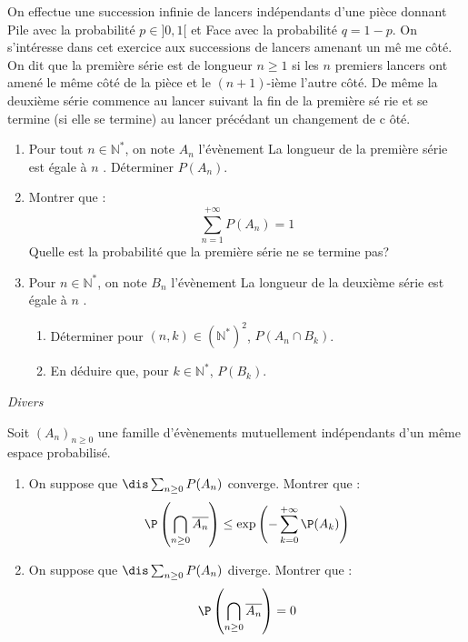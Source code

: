 \documentclass[a4paper,10pt]{report}
\begin{document}
\begin{Exercice}{} On effectue une succession infinie de lancers indépendants d'une pièce
donnant Pile avec la probabilité $p\in ]0,1[$ et Face avec la probabilité $%
q=1-p$.\newline
On s'intéresse dans cet exercice aux successions de lancers amenant un mê%
me côté.\newline
On dit que la première série est de longueur $n\geq 1$ si les $n$
premiers lancers ont amené le même côté de la pièce et le $(n+1)$-ième
l'autre côté.\newline
De même la deuxième série commence au lancer suivant la fin de la première sé%
rie et se termine (si elle se termine) au lancer précédant un changement de c%
ôté.\newline


\begin{enumerate}
\item Pour tout $n \in \mathbb{N}^*$, on note $A_n$ l'évènement \og La longueur de la première série est égale à $n$ \fg. Déterminer $P(A_n)$.
\item Montrer que :
\[\sum\limits_{n=1}^{+\infty }P(A_n)=1\]
Quelle est la probabilité que la première série ne se termine pas?

\item Pour $n \in \mathbb{N}^*$, on note $B_n$ l'évènement \og La longueur de la deuxième série est égale à $n$ \fg .

\begin{enumerate}
\item Déterminer pour $(n,k) \in (\mathbb{N}^*)^2$, $P(A_n \cap B_k)$.

\item En déduire que, pour $k\in \mathbb{N}^{* }$, $P(B_k)$.
\end{enumerate}
\end{enumerate}
\end{Exercice}


\medskip

\begin{center}
\textit{{ {\large Divers}}}
\end{center}

\medskip


\begin{Exercice}{}  Soit $(A_n)_{n \geq 0}$ une famille d'évènements mutuellement indépendants d'un même espace probabilisé.
\begin{enumerate}
\item On suppose que $\dis \sum_{n \geq 0} P(A_n)$ converge. Montrer que :
$$ \P \left( \bigcap_{n \geq 0} \overline{A_n} \right) \leq \exp \left(- \sum_{k=0}^{+ \infty} \P(A_k) \right)$$
\item On suppose que $\dis \sum_{n \geq 0} P(A_n)$ diverge. Montrer que :
$$ \P \left( \bigcap_{n \geq 0} \overline{A_n} \right) = 0$$
\end{enumerate}
\end{Exercice}
\end{document}
